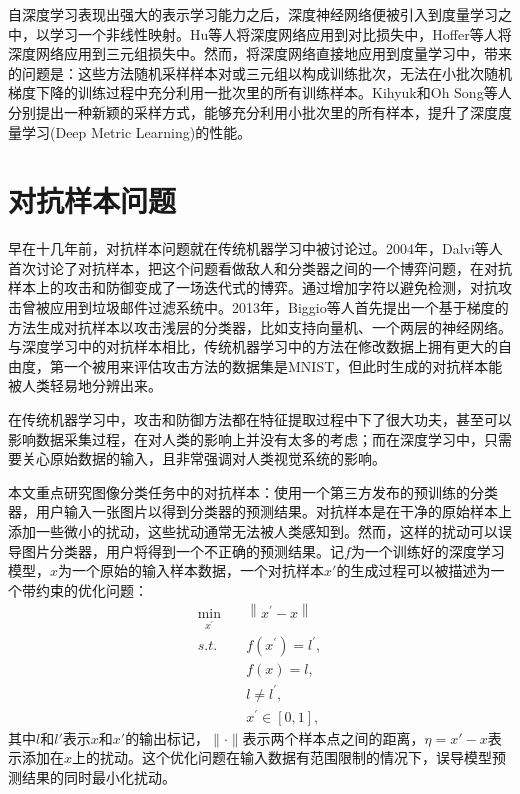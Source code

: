 自深度学习表现出强大的表示学习能力之后，深度神经网络便被引入到度量学习之中，以学习一个非线性映射。Hu等人将深度网络应用到对比损失中\cite{hu2014discriminative}，Hoffer等人将深度网络应用到三元组损失中\cite{hoffer2015deep}。然而，将深度网络直接地应用到度量学习中，带来的问题是：这些方法随机采样样本对或三元组以构成训练批次，无法在小批次随机梯度下降的训练过程中充分利用一批次里的所有训练样本。Kihyuk和Oh Song等人分别提出一种新颖的采样方式\cite{oh2016deep, sohn2016improved}，能够充分利用小批次里的所有样本，提升了深度度量学习(Deep Metric Learning)的性能。

\section{对抗样本问题}

早在十几年前，对抗样本问题就在传统机器学习中被讨论过。2004年，Dalvi等人首次讨论了对抗样本，把这个问题看做敌人和分类器之间的一个博弈问题\cite{dalvi2004adversarial}，在对抗样本上的攻击和防御变成了一场迭代式的博弈。通过增加字符以避免检测，对抗攻击曾被应用到垃圾邮件过滤系统中\cite{dalvi2004adversarial, biggio2010multiple}。2013年，Biggio等人首先提出一个基于梯度的方法生成对抗样本以攻击浅层的分类器，比如支持向量机、一个两层的神经网络\cite{biggio2013evasion}。与深度学习中的对抗样本相比，传统机器学习中的方法在修改数据上拥有更大的自由度，第一个被用来评估攻击方法的数据集是MNIST，但此时生成的对抗样本能被人类轻易地分辨出来。

在传统机器学习中，攻击和防御方法都在特征提取过程中下了很大功夫，甚至可以影响数据采集过程，在对人类的影响上并没有太多的考虑\cite{roli2013pattern}；而在深度学习中，只需要关心原始数据的输入，且非常强调对人类视觉系统的影响。

本文重点研究图像分类任务中的对抗样本：使用一个第三方发布的预训练的分类器，用户输入一张图片以得到分类器的预测结果。对抗样本是在干净的原始样本上添加一些微小的扰动，这些扰动通常无法被人类感知到。然而，这样的扰动可以误导图片分类器，用户将得到一个不正确的预测结果。记$f$为一个训练好的深度学习模型，$x$为一个原始的输入样本数据，一个对抗样本$x'$的生成过程可以被描述为一个带约束的优化问题：
\begin{equation}
    \begin{aligned}
    \min_{x^{\prime}} \quad & \left\|x^{\prime}-x\right\| \\
    s.t. \quad & f\left(x^{\prime}\right)=l^{\prime}, \\ 
               & f(x)=l, \\ 
               & l \neq l^{\prime}, \\ 
               & x^{\prime} \in[0,1],
\end{aligned}
\end{equation}
其中$l$和$l'$表示$x$和$x'$的输出标记，$\|\cdot\|$表示两个样本点之间的距离，$\eta=x'-x$表示添加在$x$上的扰动。这个优化问题在输入数据有范围限制的情况下，误导模型预测结果的同时最小化扰动。

